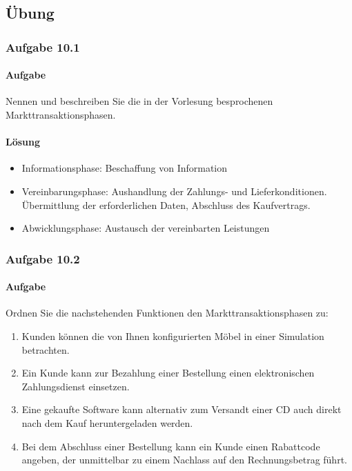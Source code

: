 \subsection{Übung}

\subsubsection*{Aufgabe 10.1}
    \paragraph*{Aufgabe}
        Nennen und beschreiben Sie die in der Vorlesung besprochenen Markttransaktionsphasen.
    \paragraph*{Lösung}
        \begin{itemize}
            \item Informationsphase: Beschaffung von Information
            \item Vereinbarungsphase: Aushandlung der Zahlungs- und Lieferkonditionen. Übermittlung der erforderlichen Daten, Abschluss des Kaufvertrags.
            \item Abwicklungsphase: Austausch der vereinbarten Leistungen
        \end{itemize}

\subsubsection*{Aufgabe 10.2}
    \paragraph*{Aufgabe}
        Ordnen Sie die nachstehenden Funktionen den Markttransaktionsphasen zu:
        \begin{enumerate}[label=\alph*)]
            \item Kunden können die von Ihnen konfigurierten Möbel in einer Simulation betrachten.
            \item Ein Kunde kann zur Bezahlung einer Bestellung einen elektronischen Zahlungsdienst
            einsetzen.
            \item Eine gekaufte Software kann alternativ zum Versandt einer CD auch direkt nach dem Kauf heruntergeladen werden.
            \item Bei dem Abschluss einer Bestellung kann ein Kunde einen Rabattcode angeben, der unmittelbar zu einem Nachlass auf den Rechnungsbetrag führt.
        \end{enumerate}

